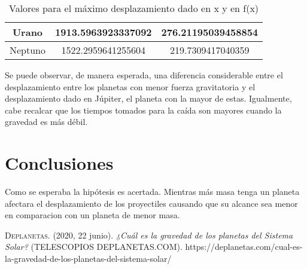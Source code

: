 \documentclass{article}
\begin{document}
\begin{table}[h!]
\begin{tabular}{|c|c|c|}
Urano            & 1913.5963923337092                                                                    & 276.21195039458854                                                                       \\ \hline
Neptuno          & 1522.2959641255604                                                                    & 219.7309417040359                                                                        \\ \hline
\end{tabular}
\caption{Valores para el m\'aximo desplazamiento dado en x y en f(x)}
\label{tab:Desplazamiento_maximo}
\end{table}


Se puede observar, de manera esperada, una diferencia considerable entre el desplazamiento entre los planetas con menor fuerza gravitatoria y el desplazamiento dado en J\'upiter, el planeta con la mayor de estas. Igualmente, cabe recalcar que los tiempos tomados para la ca\'ida son mayores cuando la gravedad es m\'as d\'ebil.

\section{Conclusiones}
Como se esperaba la hip\'otesis es acertada. Mientras más masa tenga un planeta afectara el desplazamiento de los proyectiles causando que su alcance sea menor en comparacion con un planeta de menor masa.

\begin{thebibliography}{X}
   \textsc{Deplanetas}. (2020, 22 junio).
\textit{¿Cuál es la gravedad de los planetas del Sistema Solar?} (TELESCOPIOS DEPLANETAS.COM). https://deplanetas.com/cual-es-la-gravedad-de-los-planetas-del-sistema-solar/
\end{thebibliography}
\end{document}
